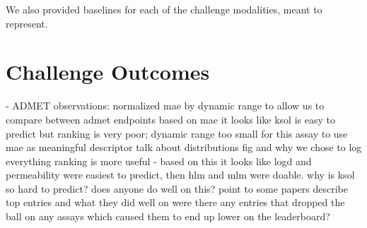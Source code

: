 \documentclass[journal=jacsat,manuscript=article]{achemso}
\begin{document}
We also provided baselines for each of the challenge modalities, meant to represent. 



\section{Challenge Outcomes}
  
- ADMET
observations:
normalized mae by dynamic range to allow us to compare between admet endpoints
based on mae it looks like ksol is easy to predict but ranking is very poor; dynamic range too small for this assay to use mae as meaningful descriptor
talk about distributions fig and why we chose to log everything
ranking is more useful - based on this it looks like logd and permeability were easiest to predict, then hlm and mlm were doable.
why is ksol so hard to predict? does anyone do well on this? point to some papers
describe top entries and what they did well on
were there any entries that dropped the ball on any assays which caused them to end up lower on the leaderboard?
\end{document}
